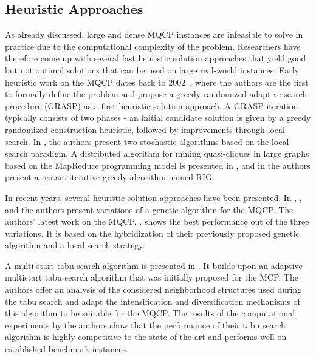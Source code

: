 \documentclass[draft,final]{vutinfth} %
\begin{document}
\subsection{Heuristic Approaches}

As already discussed, large and dense MQCP instances are infeasible to solve in practice due to the computational complexity of the problem. Researchers have therefore come up with several fast heuristic solution approaches that yield good, but not optimal solutions that can be used on large real-world instances. 
Early heuristic work on the MQCP dates back to 2002~\cite{Abello2002}, where the authors are the first to formally define the problem and propose a greedy randomized adaptive search procedure (GRASP) as a first heuristic solution approach. A GRASP iteration typically consists of two phases - an initial candidate solution is given by a greedy randomized construction heuristic, followed by improvements through local search. In \cite{Brunato2008}, the authors present two stochastic algorithms based on the local search paradigm. A distributed algorithm for mining quasi-cliques in large graphs based on the MapReduce programming model is presented in \cite{Khosraviani2011}, and in \cite{oliveira2013construction} the authors present a restart iterative greedy algorithm named RIG. 

In recent years, several heuristic solution approaches have been presented. In \cite{pinto2015biased}, \cite{pinto_biased_2018}, and \cite{pinto2021brkga} the authors present variations of a genetic algorithm for the MQCP. The authors' latest work on the MQCP, \cite{pinto2021brkga}, shows the best performance out of the three variations. It is based on the hybridization of their previously proposed genetic algorithm and a local search strategy. 

A multi-start tabu search algorithm is presented in \cite{djeddi_extension_2019}. It builds upon an adaptive multistart tabu search algorithm that was initially proposed for the MCP. The authors offer an analysis of the considered neighborhood structures used during the tabu search and adapt the intensification and diversification mechanisms of this algorithm to be suitable for the MQCP. The results of the computational experiments by the authors show that the performance of their tabu search algorithm is highly competitive to the state-of-the-art and performs well on established benchmark instances. 
\end{document}
